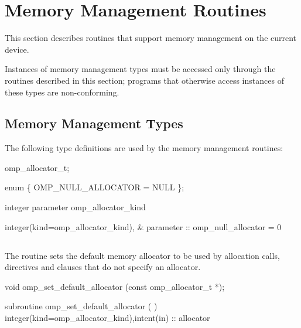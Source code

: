 \section{Memory Management Routines}
\label{sec:Memory Management Routines}
This section describes routines that support memory management on the current device.

Instances of memory management types must be accessed only through the routines described in this section; programs that otherwise access instances of these types are non-conforming.

\subsection{Memory Management Types}
\label{subsec:Memory Management Types}

The following type definitions are used by the memory management routines:

\begin{ccppspecific}
\begin{codepar}
omp_allocator_t;

enum \{ OMP_NULL_ALLOCATOR = NULL \};
\end{codepar}
\end{ccppspecific}

\begin{fortranspecific}
\begin{codepar}
integer parameter omp_allocator_kind

integer(kind=omp_allocator_kind), &
        parameter :: omp_null_allocator = 0
\end{codepar}
\end{fortranspecific}

\subsection{}
\label{subsec:omp_set_default_allocator}

\summary
The  routine sets the default memory allocator to be used by allocation calls,  directives and  clauses that do not specify an allocator.

\format
\ccppspecificstart
\begin{boxedcode}
void omp_set_default_allocator (const omp_allocator_t *);
\end{boxedcode}
\ccppspecificend
\fortranspecificstart
\begin{boxedcode}
subroutine omp_set_default_allocator (  )
integer(kind=omp_allocator_kind),intent(in) :: allocator
\end{boxedcode}
\fortranspecificend

